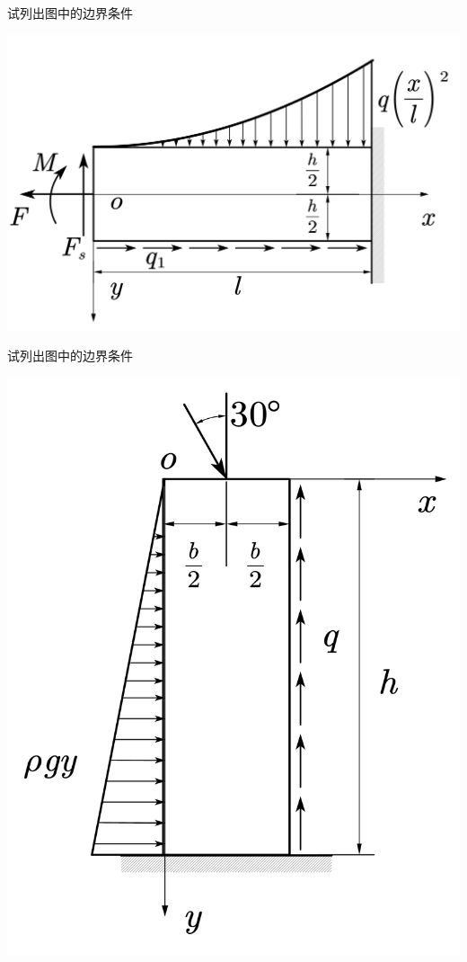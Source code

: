 \begin{example}
	试列出图中的边界条件
\end{example}
\centerline{\includegraphics[scale=0.5]{figure/2-10.png}}

\begin{example}
	试列出图中的边界条件
\end{example}
\centerline{\includegraphics[scale=0.5]{figure/2-11.png}}


